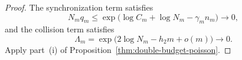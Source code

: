 \begin{proof}
The synchronization term satisfies
\[
  N_m q_m
  \leq \exp\bigl(\log C_m+\log N_m-\gamma_m n_m\bigr)
  \longrightarrow 0,
\]
and the collision term satisfies
\[
  \Lambda_m
  = \exp\bigl(2\log N_m-h_2m+o(m)\bigr)
  \longrightarrow 0.
\]
Apply part~(i) of Proposition~\ref{thm:double-budget-poisson}.
\end{proof}
